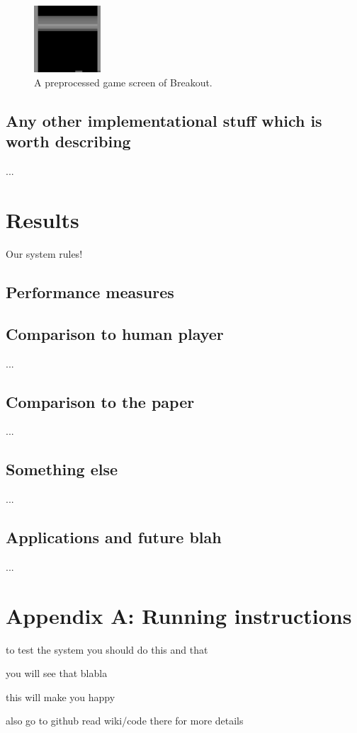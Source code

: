 \documentclass[a4paper,12pt]{article}
\begin{document}
\begin{figure}[h]
\centering
\includegraphics[width=2.5cm]{fig_preprocessedscreen}
\caption{A preprocessed game screen of Breakout.}
\label{fig:breakoutpreprocessed}
\end{figure}



\subsection{Any other implementational stuff which is worth describing}
...


%
%
\pagebreak
\section{Results}
Our system rules!

\subsection{Performance measures}

\subsection{Comparison to human player}
...

\subsection{Comparison to the paper}
...

\subsection{Something else}
...

\subsection{Applications and future blah}
...



%
%
\pagebreak
\section*{Appendix A: Running instructions}
to test the system you should do this and that

you will see that blabla

this will make you happy

also go to github read wiki/code there for more details



%
%
\pagebreak
{}


\end{document}
